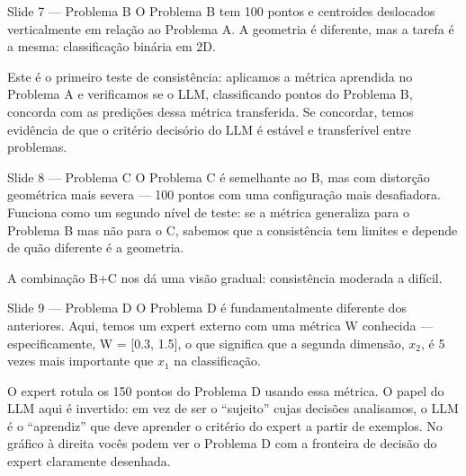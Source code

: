 \documentclass[aspectratio=169,11pt]{beamer}
\begin{document}
\begin{frame}{Slide 7 --- Problema B}
\small
O Problema B tem 100 pontos e centroides deslocados verticalmente em relação ao Problema A. A geometria é diferente, mas a tarefa é a mesma: classificação binária em 2D.

Este é o primeiro teste de consistência: aplicamos a métrica aprendida no Problema A e verificamos se o LLM, classificando pontos do Problema B, concorda com as predições dessa métrica transferida. Se concordar, temos evidência de que o critério decisório do LLM é estável e transferível entre problemas.
\end{frame}

\begin{frame}{Slide 8 --- Problema C}
\small
O Problema C é semelhante ao B, mas com distorção geométrica mais severa --- 100 pontos com uma configuração mais desafiadora. Funciona como um segundo nível de teste: se a métrica generaliza para o Problema B mas não para o C, sabemos que a consistência tem limites e depende de quão diferente é a geometria.

A combinação B+C nos dá uma visão gradual: consistência moderada a difícil.
\end{frame}

\begin{frame}{Slide 9 --- Problema D}
\small
O Problema D é fundamentalmente diferente dos anteriores. Aqui, temos um expert externo com uma métrica W conhecida --- especificamente, W = [0.3, 1.5], o que significa que a segunda dimensão, $x_2$, é 5 vezes mais importante que $x_1$ na classificação.

O expert rotula os 150 pontos do Problema D usando essa métrica. O papel do LLM aqui é invertido: em vez de ser o ``sujeito'' cujas decisões analisamos, o LLM é o ``aprendiz'' que deve aprender o critério do expert a partir de exemplos. No gráfico à direita vocês podem ver o Problema D com a fronteira de decisão do expert claramente desenhada.
\end{frame}
\end{document}
